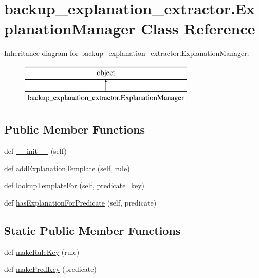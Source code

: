 \hypertarget{classbackup__explanation__extractor_1_1_explanation_manager}{}\section{backup\+\_\+explanation\+\_\+extractor.\+Explanation\+Manager Class Reference}
\label{classbackup__explanation__extractor_1_1_explanation_manager}
Inheritance diagram for backup\+\_\+explanation\+\_\+extractor.\+Explanation\+Manager\+:\begin{figure}[H]
\begin{center}
\leavevmode
\includegraphics[height=2.000000cm]{classbackup__explanation__extractor_1_1_explanation_manager}
\end{center}
\end{figure}
\subsection*{Public Member Functions}
\begin{DoxyCompactItemize}
\item 
def \hyperlink{classbackup__explanation__extractor_1_1_explanation_manager_aa2842d3b1c2f716100c77d95a52c8b6a}{\+\_\+\+\_\+init\+\_\+\+\_\+} (self)
\item 
def \hyperlink{classbackup__explanation__extractor_1_1_explanation_manager_a4e1b098346393b688f542168aebbaa62}{add\+Explanation\+Template} (self, rule)
\item 
def \hyperlink{classbackup__explanation__extractor_1_1_explanation_manager_ab5208b00e61e27dbb1c6f4b3891fbc50}{lookup\+Template\+For} (self, predicate\+\_\+key)
\item 
def \hyperlink{classbackup__explanation__extractor_1_1_explanation_manager_ae3c83379e94efca909379a8eddcb7e5d}{has\+Explanation\+For\+Predicate} (self, predicate)
\end{DoxyCompactItemize}
\subsection*{Static Public Member Functions}
\begin{DoxyCompactItemize}
\item 
def \hyperlink{classbackup__explanation__extractor_1_1_explanation_manager_ac27597c7bea9c19093d416f89a7c53f7}{make\+Rule\+Key} (rule)
\item 
def \hyperlink{classbackup__explanation__extractor_1_1_explanation_manager_a44c3459fd2b8c483e9427200bdd35888}{make\+Pred\+Key} (predicate)
\end{DoxyCompactItemize}
